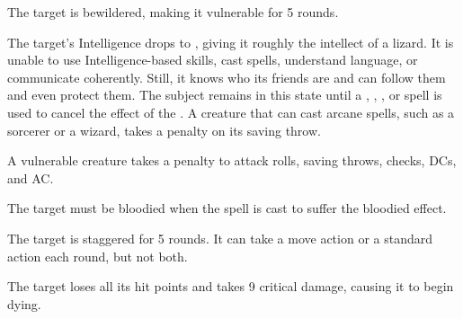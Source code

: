 \spellrng{\rngtouch}
\begin{spellhealthy}
  The target is bewildered, making it vulnerable for 5 rounds.
\end{spellhealthy}
\begin{spellblood}
  The target's Intelligence drops to , giving it roughly the intellect of a lizard. It is unable to use Intelligence-based skills, cast spells, understand language, or communicate coherently. Still, it knows who its friends are and can follow them and even protect them. The subject remains in this state until a , , , or  spell is used to cancel the effect of the . A creature that can cast arcane spells, such as a sorcerer or a wizard, takes a  penalty on its saving throw.
\end{spellblood}
\begin{spellnotes}
  A vulnerable creature takes a  penalty to attack rolls, saving throws, checks, DCs, and AC.

  The target must be bloodied when the spell is cast to suffer the bloodied effect.
\end{spellnotes}

\spellrng{\rngclose}
\begin{spellhealthy}
  The target is staggered for 5 rounds. It can take a move action or a standard action each round, but not both.
\end{spellhealthy}
\begin{spellblood}
  The target loses all its hit points and takes 9 critical damage, causing it to begin dying.
\end{spellblood}

